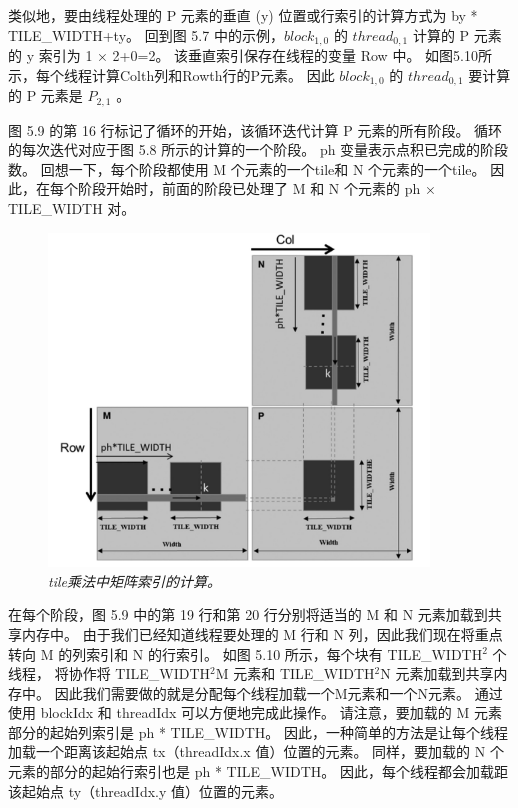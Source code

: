 类似地，要由线程处理的 P 元素的垂直 (y) 位置或行索引的计算方式为 by * TILE\_WIDTH+ty。 
回到图 5.7 中的示例，$block_{1,0}$ 的 $thread_{0,1}$ 计算的 P 元素的 y 索引为 1 × 2+0=2。 
该垂直索引保存在线程的变量 Row 中。  如图5.10所示，每个线程计算Colth列和Rowth行的P元素。 
因此 $block_{1,0}$ 的 $thread_{0,1}$ 要计算的 P 元素是 $P_{2,1}$ 。

图 5.9 的第 16 行标记了循环的开始，该循环迭代计算 P 元素的所有阶段。 
循环的每次迭代对应于图 5.8 所示的计算的一个阶段。 ph 变量表示点积已完成的阶段数。 
回想一下，每个阶段都使用 M 个元素的一个tile和 N 个元素的一个tile。 
因此，在每个阶段开始时，前面的阶段已处理了 M 和 N 个元素的 ph × TILE\_WIDTH 对。

\begin{figure}[H]
	\centering
	\includegraphics[width=0.9\textwidth]{figs/F5.10.png}
	\caption{\textit{tile乘法中矩阵索引的计算。}}
\end{figure}

在每个阶段，图 5.9 中的第 19 行和第 20 行分别将适当的 M 和 N 元素加载到共享内存中。 
由于我们已经知道线程要处理的 M 行和 N 列，因此我们现在将重点转向 M 的列索引和 N 的行索引。
如图 5.10 所示，每个块有 TILE\_WIDTH$^2$ 个线程， 
将协作将 TILE\_WIDTH$^2$M 元素和 TILE\_WIDTH$^2$N 元素加载到共享内存中。 
因此我们需要做的就是分配每个线程加载一个M元素和一个N元素。 通过使用 blockIdx 和 threadIdx 可以方便地完成此操作。 
请注意，要加载的 M 元素部分的起始列索引是 ph * TILE\_WIDTH。 
因此，一种简单的方法是让每个线程加载一个距离该起始点 tx（threadIdx.x 值）位置的元素。 
同样，要加载的 N 个元素的部分的起始行索引也是 ph * TILE\_WIDTH。 
因此，每个线程都会加载距该起始点 ty（threadIdx.y 值）位置的元素。

